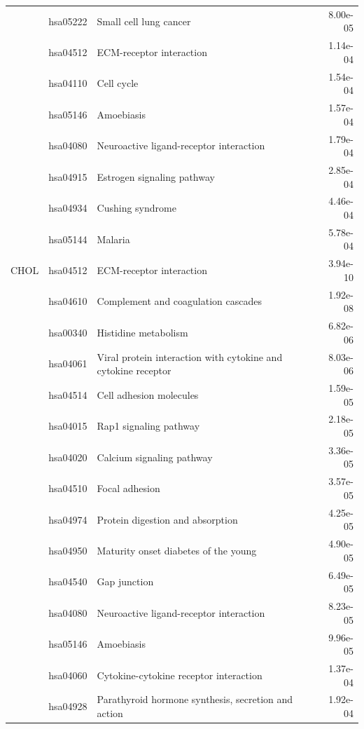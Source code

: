 \begin{longtable}{cllr}
 & hsa05222 & \textcolor{\clrnew}{Small cell lung cancer} & 8.00e-05 \\ 
 & hsa04512 & \textcolor{\clrnew}{ECM-receptor interaction} & 1.14e-04 \\ 
 & hsa04110 & \textcolor{\clrnew}{Cell cycle} & 1.54e-04 \\ 
 & hsa05146 & \textcolor{\clrnew}{Amoebiasis} & 1.57e-04 \\ 
 & hsa04080 & \textcolor{\clrnew}{Neuroactive ligand-receptor interaction} & 1.79e-04 \\ 
 & hsa04915 & \textcolor{\clrnew}{Estrogen signaling pathway} & 2.85e-04 \\ 
 & hsa04934 & \textcolor{\clrnew}{Cushing syndrome} & 4.46e-04 \\ 
 & hsa05144 & \textcolor{\clrnew}{Malaria} & 5.78e-04 \\ 
\midrule 
CHOL & hsa04512 & \textcolor{\clrnew}{ECM-receptor interaction} & 3.94e-10\\ 
 & hsa04610 & \textcolor{\clrnew}{Complement and coagulation cascades} & 1.92e-08 \\ 
 & hsa00340 & \textcolor{\clrnew}{Histidine metabolism} & 6.82e-06 \\ 
 & hsa04061 & \textcolor{\clrnew}{Viral protein interaction with cytokine and cytokine receptor} & 8.03e-06 \\ 
 & hsa04514 & \textcolor{\clrnew}{Cell adhesion molecules} & 1.59e-05 \\ 
 & hsa04015 & \textcolor{\clrnew}{Rap1 signaling pathway} & 2.18e-05 \\ 
 & hsa04020 & \textcolor{\clrnew}{Calcium signaling pathway} & 3.36e-05 \\ 
 & hsa04510 & \textcolor{\clrnew}{Focal adhesion} & 3.57e-05 \\ 
 & hsa04974 & \textcolor{\clrnew}{Protein digestion and absorption} & 4.25e-05 \\ 
 & hsa04950 & \textcolor{\clrnew}{Maturity onset diabetes of the young} & 4.90e-05 \\ 
 & hsa04540 & \textcolor{\clrnew}{Gap junction} & 6.49e-05 \\ 
 & hsa04080 & \textcolor{\clrnew}{Neuroactive ligand-receptor interaction} & 8.23e-05 \\ 
 & hsa05146 & \textcolor{\clrnew}{Amoebiasis} & 9.96e-05 \\ 
 & hsa04060 & \textcolor{\clrnew}{Cytokine-cytokine receptor interaction} & 1.37e-04 \\ 
 & hsa04928 & \textcolor{\clrnew}{Parathyroid hormone synthesis, secretion and action} & 1.92e-04 \\ 

\end{longtable}
